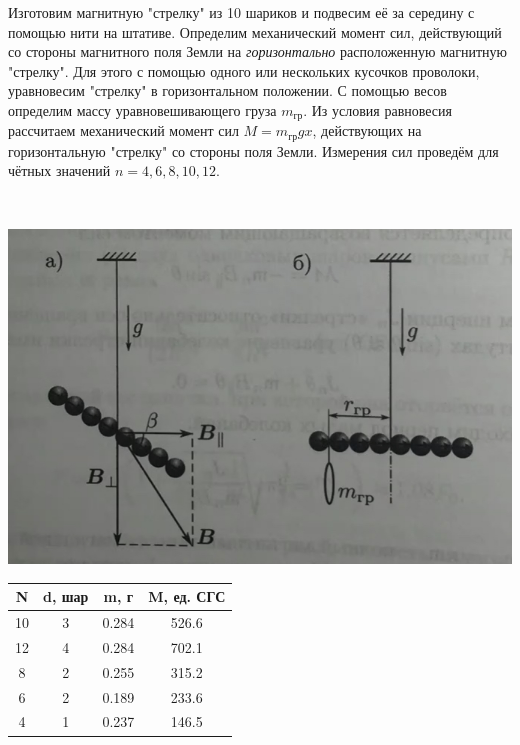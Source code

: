 \documentclass[a4paper,12pt]{article}
\begin{document}
\begin{minipage}{0.45\textwidth}

Изготовим магнитную "стрелку" из 10 шариков и подвесим её за середину с помощью нити на штативе.
Определим механический момент сил, действующий со стороны магнитного поля Земли на \textit{горизонтально} расположенную магнитную "стрелку". Для этого с помощью одного или нескольких кусочков проволоки, уравновесим "стрелку" в горизонтальном положении.
С помощью весов определим массу уравновешивающего груза $m_{гр}$.
Из условия равновесия рассчитаем механический момент сил $M = m_{гр}gx$, действующих на горизонтальную "стрелку"  со стороны поля Земли. Измерения сил проведём для чётных значений $n = 4,6,8,10,12$.
\end{minipage}
\begin{minipage}{0.05\textwidth}
\
\end{minipage}
\begin{minipage}{0.45\textwidth}
\begin{center}
\includegraphics[width=\linewidth]{4.jpg}\\
\end{center}
\end{minipage}

\begin{center}
\begin{table}[h]
\begin{tabular}{|c|c|c|c|}
\hline
N  & d, шар & m, г  & M, ед. СГС \\ \hline
10 & 3      & 0.284 & 526.6      \\ \hline
12 & 4      & 0.284 & 702.1      \\ \hline
8  & 2      & 0.255 & 315.2      \\ \hline
6  & 2      & 0.189 & 233.6      \\ \hline
4  & 1      & 0.237 & 146.5      \\ \hline
\end{tabular}
\end{table}
\end{center}
\end{document}
